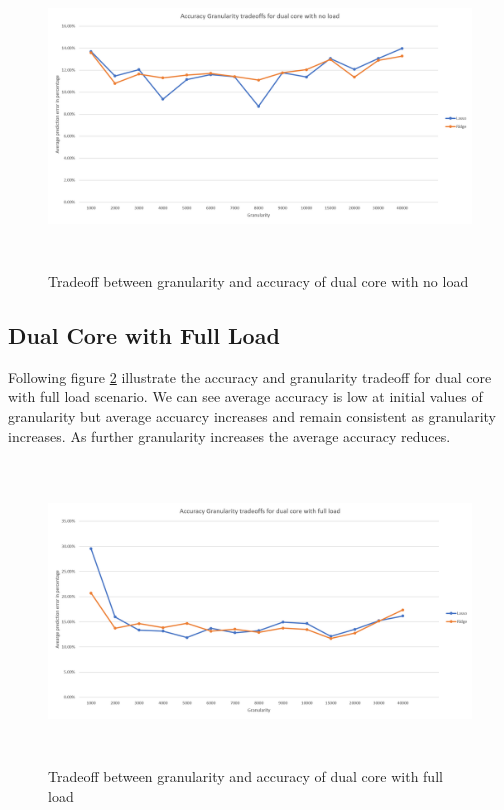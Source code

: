 \begin{figure}[h!]
\includegraphics[width=12cm, height=8cm]{./images/td_noload}
\centering
\caption{Tradeoff between granularity and accuracy of dual core with no load}
\label{fig:td_noload}
\end{figure}

\subsection{Dual Core with Full Load}
Following figure \ref{fig:td_fullload} illustrate the accuracy and granularity tradeoff for dual core with full load scenario. We can see average accuracy is low at initial values of granularity but average accuarcy increases and remain consistent as granularity increases. As further granularity increases the average accuracy reduces. 

\begin{figure}[h!]
\includegraphics[width=12cm, height=8cm]{./images/td_fullload}
\centering
\caption{Tradeoff between granularity and accuracy of dual core with full load}
\label{fig:td_fullload}
\end{figure}

